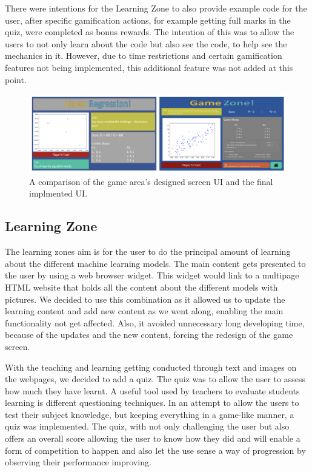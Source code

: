 		There were intentions for the Learning Zone to also provide example code for the user, after specific gamification actions, for example getting full marks in the quiz, were completed as bonus rewards. The intention of this was to allow the users to not only learn about the code but also see the code, to help see the mechanics in it. However, due to time restrictions and certain gamification features not being implemented, this additional feature was not added at this point.
		
		\begin{figure}[t]
			\includegraphics[width=15cm]{graphics/game_zone.png}
			\caption{A comparison of the game area's designed screen UI and the final implmented UI.}
			\label{fig:ui_ga}
		\end{figure}
	
	\subsection{Learning Zone}
	
	The learning zones aim is for the user to do the principal amount of learning about the different machine learning models. The main content gets presented to the user by using a web browser widget. This widget would link to a multipage HTML website that holds all the content about the different models with pictures. We decided to use this combination as it allowed us to update the learning content and add new content as we went along, enabling the main functionality not get affected. Also, it avoided unnecessary long developing time, because of the updates and the new content, forcing the redesign of the game screen. 
	
	With the teaching and learning getting conducted through text and images on the webpages, we decided to add a quiz. The quiz was to allow the user to assess how much they have learnt. A useful tool used by teachers to evaluate students learning is different questioning techniques. In an attempt to allow the users to test their subject knowledge, but keeping everything in a game-like manner, a quiz was implemented. The quiz, with not only challenging the user but also offers an overall score allowing the user to know how they did and will enable a form of competition to happen and also let the use sense a way of progression by observing their performance improving.
	
